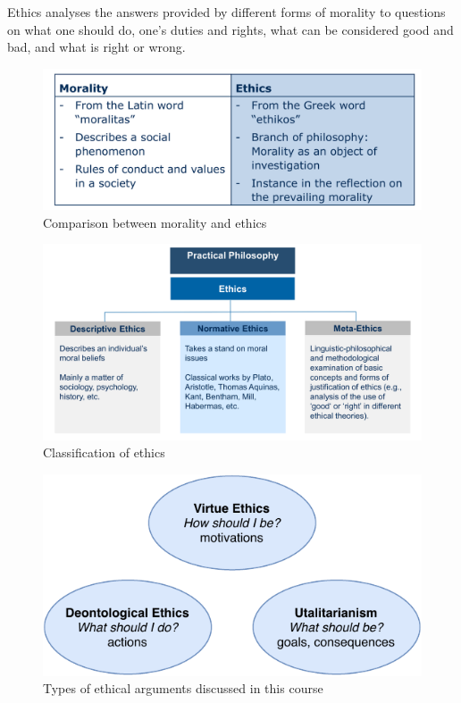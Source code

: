 \documentclass[11pt]{article}
\theoremstyle{definition}
\begin{document}
Ethics analyses the answers provided by different forms of morality to questions on what one should do, one's duties and rights, what can be considered good and bad, and what is right or wrong.

\begin{figure}[tbh]
	\centering
	\includegraphics[width=0.6\linewidth]{img/morality_ethics}
	\caption{Comparison between morality and ethics}
	\label{fig:moralityethics}
\end{figure}

\begin{figure}[tbh]
	\centering
	\includegraphics[width=0.8\linewidth]{img/classification_ethics}
	\caption{Classification of ethics}
	\label{fig:classificationethics}
\end{figure}

\begin{figure}[tbh]
	\centering
	\includegraphics[width=0.8\linewidth]{img/ethics_overview.pdf}
	\caption{Types of ethical arguments discussed in this course}
	\label{fig:overviewethics}
\end{figure}
\end{document}
